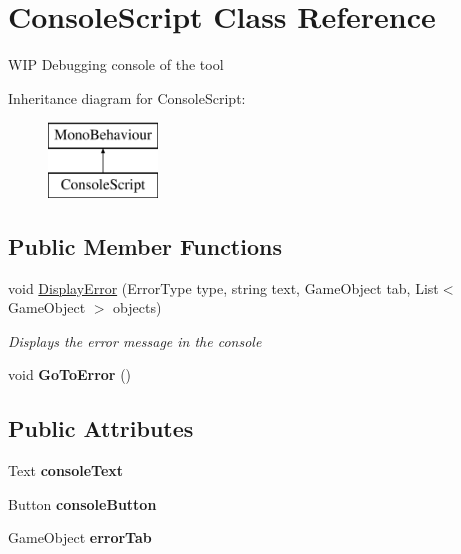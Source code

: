 \hypertarget{class_console_script}{}\section{Console\+Script Class Reference}
\label{class_console_script}


W\+IP Debugging console of the tool  


Inheritance diagram for Console\+Script\+:\begin{figure}[H]
\begin{center}
\leavevmode
\includegraphics[height=2.000000cm]{class_console_script}
\end{center}
\end{figure}
\subsection*{Public Member Functions}
\begin{DoxyCompactItemize}
\item 
void \hyperlink{class_console_script_a1c1670e872384c1bc97b8bbeecbb0e08}{Display\+Error} (Error\+Type type, string text, Game\+Object tab, List$<$ Game\+Object $>$ objects)
\begin{DoxyCompactList}\small\item\em Displays the error message in the console \end{DoxyCompactList}\item 
\mbox{\label{class_console_script_a4adcec6051afdbbeaa152d4d9a5fdb35}} 
void {\bfseries Go\+To\+Error} ()
\end{DoxyCompactItemize}
\subsection*{Public Attributes}
\begin{DoxyCompactItemize}
\item 
\mbox{\label{class_console_script_a354d1061b55468819d14a4d709b5a759}} 
Text {\bfseries console\+Text}
\item 
\mbox{\label{class_console_script_addd68fdcc48b4929f1c5f71ed4880fb5}} 
Button {\bfseries console\+Button}
\item 
\mbox{\label{class_console_script_ade9e2262d3a3159072b69a4548b1a02e}} 
Game\+Object {\bfseries error\+Tab}
\end{DoxyCompactItemize}



